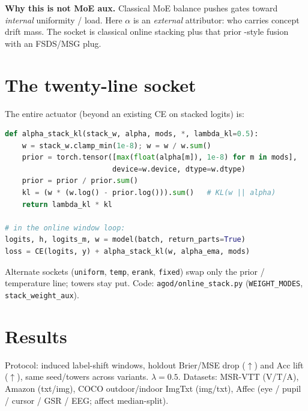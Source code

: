 \documentclass[11pt]{article}
\begin{document}
\textbf{Why this is not MoE aux.}
Classical MoE balance pushes gates toward \emph{internal} uniformity /
load. Here $\alpha$ is an \emph{external} attributor: who carries concept
drift mass. The socket is classical online stacking plus that prior
\cite{wolpert1992stacked}-style fusion with an FSDS/MSG plug.

\section{The twenty-line socket}
\label{sec:code}

The entire actuator (beyond an existing CE on stacked logits) is:

\begin{lstlisting}[language=Python,caption={Attribution prior on stacking weights ($\sim$20 LOC).}]
def alpha_stack_kl(stack_w, alpha, mods, *, lambda_kl=0.5):
    w = stack_w.clamp_min(1e-8); w = w / w.sum()
    prior = torch.tensor([max(float(alpha[m]), 1e-8) for m in mods],
                         device=w.device, dtype=w.dtype)
    prior = prior / prior.sum()
    kl = (w * (w.log() - prior.log())).sum()   # KL(w || alpha)
    return lambda_kl * kl

# in the online window loop:
logits, h, logits_m, w = model(batch, return_parts=True)
loss = CE(logits, y) + alpha_stack_kl(w, alpha_ema, mods)
\end{lstlisting}

Alternate sockets (\texttt{uniform}, \texttt{temp}, \texttt{erank},
\texttt{fixed}) swap only the prior / temperature line; towers stay put.
Code: \texttt{agod/online\_stack.py} (\texttt{WEIGHT\_MODES},
\texttt{stack\_weight\_aux}).

\section{Results}
\label{sec:results}

Protocol: induced label-shift windows, holdout Brier/MSE drop ($\uparrow$)
and Acc lift ($\uparrow$), same seed/towers across variants.
$\lambda{=}0.5$. Datasets: MSR-VTT (V/T/A), Amazon (txt/img),
COCO outdoor/indoor ImgTxt (img/txt), Affec
(eye / pupil / cursor / GSR / EEG; affect median-split).
\end{document}
